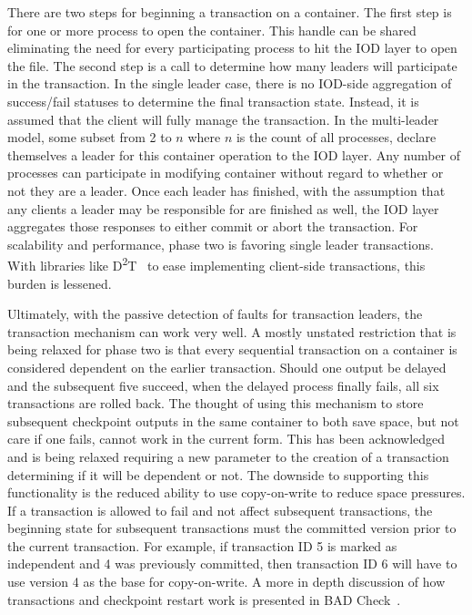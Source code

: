 \documentclass[conference]{IEEEtran} \pdfpagewidth=8.5in
\begin{document}
There are two steps for beginning a transaction on a container. The first step
is for one or more process to open the container. This handle can be shared
eliminating the need for every participating process to hit the IOD layer to
open the file. The second step is a call to determine how many leaders will
participate in the transaction. In the single leader case, there is no
IOD-side aggregation of success/fail statuses to determine the final
transaction state.  Instead, it is assumed that the client will fully manage
the transaction. In the multi-leader model, some subset from 2 to $n$ where $n$
is the count of all processes, declare themselves a leader for this container
operation to the IOD layer. Any number of processes can participate in
modifying container without regard to whether or not they are a leader. Once
each leader has finished, with the assumption that any clients a leader may be
responsible for are finished as well, the IOD layer aggregates those responses
to either commit or abort the transaction. For scalability and performance,
phase two is favoring single leader transactions. With libraries like
D\textsuperscript{2}T~\cite{lofstead:2012:txn,lofstead:2013:pdsw-txn,lofstead:2014:txn}
to ease implementing client-side transactions, this burden is lessened.

Ultimately, with the passive detection of faults for transaction leaders, the
transaction mechanism can work very well. A mostly unstated restriction that is
being relaxed for phase two is that every sequential transaction on a container
is considered dependent on the earlier transaction. Should one output be
delayed and the subsequent five succeed, when the delayed process finally
fails, all six transactions are rolled back. The thought of using this
mechanism to store subsequent checkpoint outputs in the same container to both
save space, but not care if one fails, cannot work in the current form. This
has been acknowledged and is being relaxed requiring a new parameter to the
creation of a transaction determining if it will be dependent or not. The
downside to supporting this functionality is the reduced ability to use
copy-on-write to reduce space pressures. If a transaction is allowed to fail
and not affect subsequent transactions, the beginning state for subsequent
transactions must the committed version prior to the current transaction. For
example, if transaction ID 5 is marked as independent and 4 was previously
committed, then transaction ID 6 will have to use version 4 as the base for
copy-on-write.  A more in depth discussion of how transactions and checkpoint
restart work is presented in BAD Check~\cite{bent:2015:pdsw}.
\end{document}
